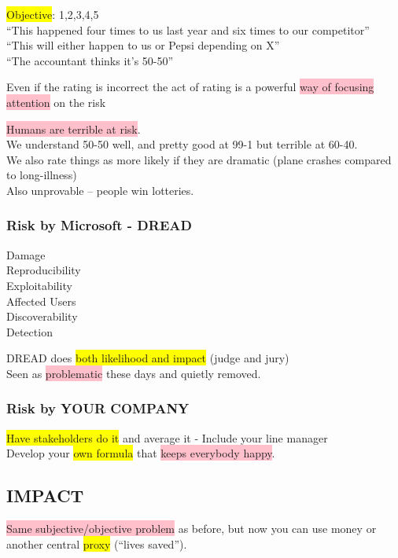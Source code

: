 \documentclass[tikz,border=10pt]{project_plan}
\begin{document}
\colorbox{yellow}{Objective}: 1,2,3,4,5\\
“This happened four times to us last year and six times to our competitor”\\
“This will either happen to us or Pepsi depending on X” \\
“The accountant thinks it’s 50-50”

Even if the rating is incorrect the act of rating is a powerful \colorbox{pink}{way of focusing attention} on the risk

\colorbox{pink}{Humans are terrible at risk}. \\
We understand 50-50 well, and pretty good at 99-1 but terrible at 60-40.  \\
We also rate things as more likely if they are dramatic (plane crashes compared to long-illness)\\
Also unprovable – people win lotteries.

\subsubsection{Risk by Microsoft - DREAD}

Damage\\
Reproducibility\\
Exploitability\\
Affected Users\\
Discoverability \\
Detection

DREAD does \colorbox{yellow}{both likelihood and impact} (judge and jury) \\
Seen as \colorbox{pink}{problematic} these days and quietly removed.

\subsubsection{Risk by YOUR COMPANY}

\colorbox{yellow}{Have stakeholders do it} and average it -  Include your line manager\\
Develop your \colorbox{yellow}{own formula} that \colorbox{pink}{keeps everybody happy}.

\subsection{IMPACT}

\colorbox{pink}{Same subjective/objective problem} as before, but now you can use money or another central \colorbox{yellow}{proxy} (“lives saved”).
\end{document}
